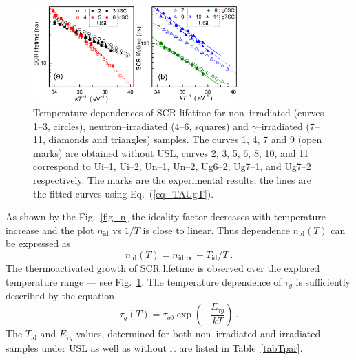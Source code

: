 \documentclass[aip,jap, amsmath,amssymb,reprint]{revtex4-1}
\begin{document}
\begin{figure}
\includegraphics[width=0.7\textwidth]{fig_4ab}%
\caption{\label{fig_TAUg}
Temperature dependences of SCR lifetime for non--irradiated (curves 1--3, circles),
neutron--irradiated (4--6, squares) and $\gamma$--irradiated (7--11, diamonds and triangles) samples.
The curves 1, 4, 7 and 9 (open marks) are obtained without USL,
curves 2, 3, 5, 6, 8, 10, and 11 correspond to
Ui--1, Ui--2, Un--1, Un--2, Ug6--2, Ug7--1, and Ug7--2 respectively.
The marks are the experimental results, the lines are the fitted curves using Eq.~(\ref{eq_TAUgT}).
}%
\end{figure}

As shown by the Fig.~\ref{fig_n} the ideality factor decreases with temperature increase and the plot $n_{\mathrm{id}}$ vs $1/T$  is close to linear.
Thus dependence $n_{\mathrm{id}}(T)$ can be expressed as
\begin{equation}
\label{eq_nT}
    n_{\mathrm{id}}(T)=n_{\mathrm{id},\infty}+T_{\mathrm{id}}/T\:.
\end{equation}
The thermoactivated growth of SCR lifetime is observed over the explored temperature range --- see Fig.~\ref{fig_TAUg}.
The temperature dependence of $\tau_{g}$ is sufficiently described by the equation 
\begin{equation}
\label{eq_TAUgT}
    \tau_{g}(T)=\tau_{g0}\exp\left(-\frac{E_{\tau g}}{kT}\right)\:.
\end{equation}
The $T_{\mathrm{id}}$ and $E_{\tau g}$ values, determined for both non--irradiated and irradiated samples under USL as well as without it are listed in Table~\ref{tabTpar}.
\end{document}
